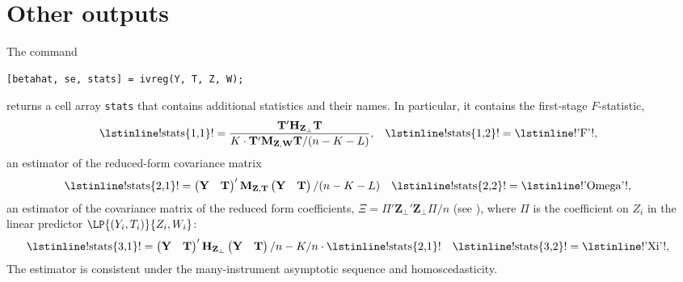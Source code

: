 \documentclass{mynotes}
\newcommand{\by}{\mathbf{Y}} %
\newcommand{\bt}{\mathbf{T}} %
\newcommand{\bz}{\mathbf{Z}} %
\newcommand{\bw}{\mathbf{W}} %
\newcommand{\Hm}[1]{\mathbf{H}_{#1}} %
\newcommand{\Mm}[1]{\mathbf{M}_{#1}} %
\begin{document}


\section{Other outputs}
The command
\begin{lstlisting}
[betahat, se, stats] = ivreg(Y, T, Z, W);
\end{lstlisting}
returns a cell array \lstinline!stats! that contains additional statistics and
their names. In particular, it contains the first-stage $F$-statistic,
\begin{align*}
  \text{\lstinline!stats\{1,1\}!} &= \frac{\bt'\Hm{\bz_{\perp}}\bt}{K \cdot\bt'\Mm{\bz,\bw}\bt /(n-K-L)},&
  \text{\lstinline!stats\{1,2\}!} &= \text{\lstinline!'F'!},
\end{align*}
an estimator of the reduced-form covariance matrix
\begin{align*}
  \text{\lstinline!stats\{2,1\}!}&=
  \begin{pmatrix}
    \by&\bt
  \end{pmatrix}' \Mm{\bz,\bt} \begin{pmatrix}
    \by&\bt
  \end{pmatrix}/(n-K-L)&
  \text{\lstinline!stats\{2,2\}!} &= \text{\lstinline!'Omega'!},
\end{align*}
an estimator of the covariance matrix of the reduced form coefficients,
$\Xi=\Pi'\bz_{\perp}'\bz_{\perp}\Pi/n$ (see \citet{kolesar12late}), where $\Pi$
is the coefficient on $Z_{i}$ in the linear predictor
$\LP{(Y_{i},T_{i})}{Z_{i},W_{i}}$:
\begin{align*}
  \text{\lstinline!stats\{3,1\}!}&=
  \begin{pmatrix}
    \by&\bt
  \end{pmatrix}' \Hm{\bz_{\perp}} \begin{pmatrix}
    \by&\bt
  \end{pmatrix}/n-K/n\cdot     \text{\lstinline!stats\{2,1\}!}&
  \text{\lstinline!stats\{3,2\}!} &= \text{\lstinline!'Xi'!},
\end{align*}
The estimator is consistent under the many-instrument asymptotic sequence and
homoscedasticity.
\end{document}
